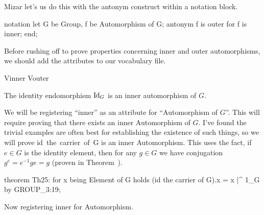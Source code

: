 Mizar let's us do this with the {\Tt{}antonym\nwendquote} construct within a
{\Tt{}notation\nwendquote} block.

\nwenddocs{}\endmoddef\nwstartdeflinemarkup{}\nwenddeflinemarkup
notation
  let G be Group, f be Automorphism of G;
  antonym f is outer for f is inner;
end;
\eatline
{}\nwendcode{}\nwdocspar
\begin{voc}
Before rushing off to prove properties concerning inner and outer
automorphisms, we should add the attributes to our vocabulary file.
\end{voc}

\nwenddocs{}\plusendmoddef\nwstartdeflinemarkup{}\nwenddeflinemarkup
Vinner
Vouter
\nwendcode{}\nwdocspar

\begin{theorem}\label{thm:characteristic:id-inner}
The identity endomorphism $\operatorname{Id}_{G}$ is an inner automorphism of $G$.
\end{theorem}

We will be registering ``inner'' as an attribute for ``Automorphism
of $G$''. This will require proving that there exists an inner
Automorphism of $G$. I've found the trivial examples are often best for
establishing the existence of such things, so we will prove {\Tt{}id\ the\ carrier\ of\ G\nwendquote} is
an inner Automorphism. This uses the fact, if $e\in G$ is the identity
element, then for any $g\in G$ we have conjugation $g^{e} = e^{-1}ge=g$
(proven in Theorem~).

\nwenddocs{}\endmoddef\nwstartdeflinemarkup{}\nwenddeflinemarkup
theorem Th25:
  for x being Element of G holds (id the carrier of G).x = x |^ 1_G
  by GROUP_3:19;
\eatline
{}\nwendcode{}\nwdocspar
\begin{registration}
Now registering {\Tt{}inner\nwendquote} for {\Tt{}Automorphism\nwendquote}.
\end{registration}

